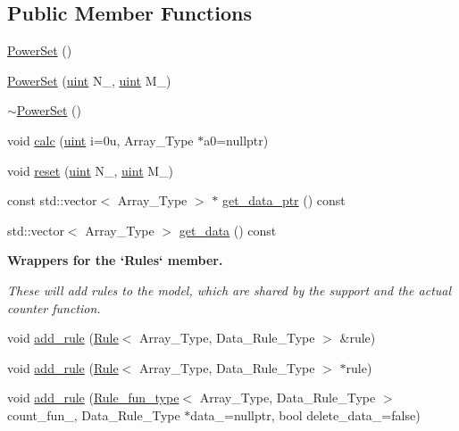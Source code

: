 \subsection*{Public Member Functions}
\begin{DoxyCompactItemize}
\item 
\hyperlink{class_power_set_a095815ccc44c88e0da73d92c6b5cf5f3}{Power\+Set} ()
\item 
\hyperlink{class_power_set_abf6ac4224da7ae4d187d0d63833615b1}{Power\+Set} (\hyperlink{typedefs_8hpp_a91ad9478d81a7aaf2593e8d9c3d06a14}{uint} N\+\_\+, \hyperlink{typedefs_8hpp_a91ad9478d81a7aaf2593e8d9c3d06a14}{uint} M\+\_\+)
\item 
\hyperlink{class_power_set_a89a176c9517e81a066adffad3c46aba5}{$\sim$\+Power\+Set} ()
\item 
void \hyperlink{class_power_set_ab15a2b22478e72f351b8ac11392d22c6}{calc} (\hyperlink{typedefs_8hpp_a91ad9478d81a7aaf2593e8d9c3d06a14}{uint} i=0u, Array\+\_\+\+Type $\ast$a0=nullptr)
\item 
void \hyperlink{class_power_set_aba11dd8802cd2eb529c7c30b55994248}{reset} (\hyperlink{typedefs_8hpp_a91ad9478d81a7aaf2593e8d9c3d06a14}{uint} N\+\_\+, \hyperlink{typedefs_8hpp_a91ad9478d81a7aaf2593e8d9c3d06a14}{uint} M\+\_\+)
\item 
const std\+::vector$<$ Array\+\_\+\+Type $>$ $\ast$ \hyperlink{class_power_set_a99cf1aa56e63a16c023bf7057b0b9288}{get\+\_\+data\+\_\+ptr} () const
\item 
std\+::vector$<$ Array\+\_\+\+Type $>$ \hyperlink{class_power_set_a4de44631d9a7967db4dd791d42166115}{get\+\_\+data} () const
\end{DoxyCompactItemize}
\begin{Indent}\textbf{ Wrappers for the `\+Rules` member.}\par
{\em These will add rules to the model, which are shared by the support and the actual counter function. }\begin{DoxyCompactItemize}
\item 
void \hyperlink{class_power_set_a00ee318a40da91bcf0bff79bf71454ab}{add\+\_\+rule} (\hyperlink{class_rule}{Rule}$<$ Array\+\_\+\+Type, Data\+\_\+\+Rule\+\_\+\+Type $>$ \&rule)
\item 
void \hyperlink{class_power_set_a6cb8fb8f09b4c190e2ac6c07daa1241e}{add\+\_\+rule} (\hyperlink{class_rule}{Rule}$<$ Array\+\_\+\+Type, Data\+\_\+\+Rule\+\_\+\+Type $>$ $\ast$rule)
\item 
void \hyperlink{class_power_set_aae5eae12186fff037efa3884ac2b3dcc}{add\+\_\+rule} (\hyperlink{typedefs_8hpp_a2e147c9c0e8b65be614c98a5dd400d5c}{Rule\+\_\+fun\+\_\+type}$<$ Array\+\_\+\+Type, Data\+\_\+\+Rule\+\_\+\+Type $>$ count\+\_\+fun\+\_\+, Data\+\_\+\+Rule\+\_\+\+Type $\ast$data\+\_\+=nullptr, bool delete\+\_\+data\+\_\+=false)
\end{DoxyCompactItemize}
\end{Indent}
